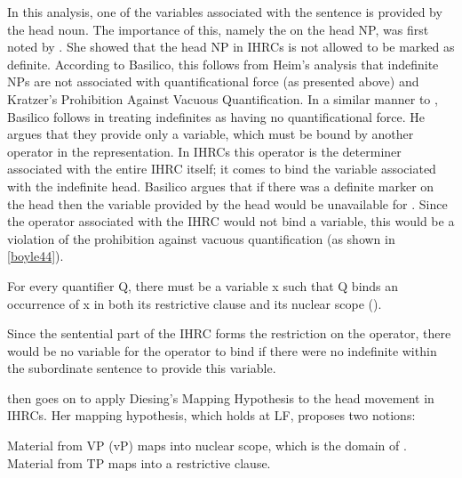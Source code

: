 \documentclass[output=paper]{LSP/langsci}
\begin{document}
In this analysis, one of the variables associated with the sentence is provided by the head noun. The importance of this, namely the  on the head NP, was first noted by \citet{Williamson1987}. She showed that the head NP in IHRCs is not allowed to be marked as definite. According to Basilico, this follows from Heim's \citeyearpar{Heim1982} analysis that indefinite NPs are not associated with quantificational force (as presented above) and Kratzer's \citeyearpar{Kratzer1989} Prohibition Against Vacuous Quantification. In a similar manner to \citet{Culy1990}, Basilico follows \citet{Heim1982} in treating indefinites as having no quantificational force. He argues that they provide only a variable, which must be bound by another operator in the representation. In IHRCs this operator is the determiner associated with the entire IHRC itself; it comes to bind the variable associated with the indefinite head. Basilico argues that if there was a definite marker on the head then the variable provided by the head would be unavailable for . Since the operator associated with the IHRC would not bind a variable, this would be a violation of the prohibition against vacuous quantification (as shown in \ref{boyle44}).

\ea For every quantifier Q, there must be a variable x such that Q binds an occurrence of x in both its restrictive clause and its nuclear scope (\citealt{Kratzer1989}). \label{boyle44} 
\z

Since the sentential part of the IHRC forms the restriction on the operator, there would be no variable for the operator to bind if there were no indefinite within the subordinate sentence to provide this variable.

\citeauthor{Basilico1996} then goes on to apply Diesing's \citeyearpar{Diesing1990, Diesing1992a, Diesing1992b} Mapping Hypothesis to the head movement in IHRCs. Her mapping hypothesis, which holds at LF, proposes two notions:

\ea \label{boyle45}
\begin{xlist}
\ex Material from VP (vP) maps into nuclear scope, which is the domain of .
\ex Material from TP maps into a restrictive clause.
\end{xlist}
\z
 
\end{document}
